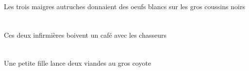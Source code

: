 \begin{exe}
\DEFPlObl{}   \grosAPl{}   \noirAPl{}   \coussinAPlObl{}   \SUR{}   \DEFPlErg{}   \troisDPl{}   \maigreDPl{}   \autrucheDPlErg{}   \INDPlAbs{}   \blancDPl{}   \oeufDPlAbs{}  \donnerVdPstDPl{}\\
\DEFPlOblP{}   \grosAPlP{}   \noirAPlP{}   \coussinAPlOblP{}   \SURP{}   \DEFPlErgP{}   \troisDPlP{}   \maigreDPlP{}   \autrucheDPlErgP{}   \INDPlAbsP{}   \blancDPlP{}   \oeufDPlAbsP{}  \donnerVdPstDPlP{}\\
\DEFPlOblG{}   \grosAPlG{}   \noirAPlG{}   \coussinAPlOblG{}   \SURG{}   \DEFPlErgG{}   \troisDPlG{}   \maigreDPlG{}   \autrucheDPlErgG{}   \INDPlAbsG{}   \blancDPlG{}   \oeufDPlAbsG{}  \donnerVdPstDPlG{}\\
Les trois maigres autruches donnaient des oeufs blancs sur les gros coussins noirs
\ex\glll
\DEFPlObl{}   \chasseurCPlObl{}   \AVEC{}   \DEMDuErg{}   \infirmiereBDuErg{}   \INDSgAbs{}   \cafeDSgAbs{}  \boireVtPrsDSg{}\\
\DEFPlOblP{}   \chasseurCPlOblP{}   \AVECP{}   \DEMDuErgP{}   \infirmiereBDuErgP{}   \INDSgAbsP{}   \cafeDSgAbsP{}  \boireVtPrsDSgP{}\\
\DEFPlOblG{}   \chasseurCPlOblG{}   \AVECG{}   \DEMDuErgG{}   \infirmiereBDuErgG{}   \INDSgAbsG{}   \cafeDSgAbsG{}  \boireVtPrsDSgG{}\\
Ces deux infirmières boivent un café avec les chasseurs
\ex\glll
\INDSgErg{}   \petitCSg{}   \filleCSgErg{}    \DEFSgDat{}   \grosASg{}   \coyoteASgDat{}   \INDDuAbs{}   \viandeADuAbs{}  \lancerVdPrsADu{}\\
\INDSgErgP{}   \petitCSgP{}   \filleCSgErgP{}    \DEFSgDatP{}   \grosASgP{}   \coyoteASgDatP{}   \INDDuAbsP{}   \viandeADuAbsP{}  \lancerVdPrsADuP{}\\
\INDSgErgG{}   \petitCSgG{}   \filleCSgErgG{}    \DEFSgDatG{}   \grosASgG{}   \coyoteASgDatG{}   \INDDuAbsG{}   \viandeADuAbsG{}  \lancerVdPrsADuG{}\\
Une petite fille lance deux viandes au gros coyote
\end{exe}
